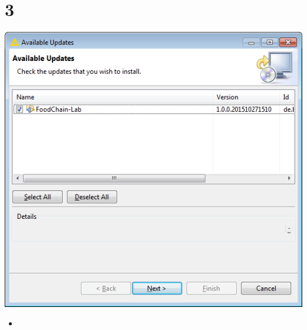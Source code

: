 \documentclass{beamer}
\begin{document}
\section{3}
\begin{frame}
	\begin{center}
  		\includegraphics[height=0.6\textheight]{3.png}
	\end{center}
	\begin{itemize}
		\item
	\end{itemize}
\end{frame}
\end{document}
